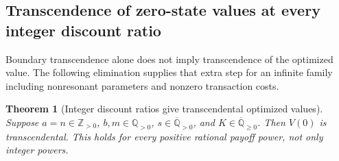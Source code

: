 \documentclass[11pt,a4paper]{article}
\newtheorem{theorem}{Theorem}[section]
\theoremstyle{definition}
\theoremstyle{remark}
\numberwithin{equation}{section}
\begin{document}
\subsection{Transcendence of zero-state values at every integer discount ratio}

Boundary transcendence alone does not imply transcendence of the
optimized value.  The following elimination supplies that extra step
for an infinite family including nonresonant parameters and nonzero
transaction costs.

\begin{theorem}[Integer discount ratios give transcendental optimized values]
\label{p1:stp:integervalue}
Suppose $a=n\in\mathbb Z_{>0}$, $b,m\in\mathbb Q_{>0}$,
$s\in\overline{\mathbb Q}_{>0}$, and
$K\in\overline{\mathbb Q}_{\ge0}$.  Then $V(0)$ is
transcendental.  This holds for every positive rational payoff power,
not only integer powers.
\end{theorem}
\end{document}
